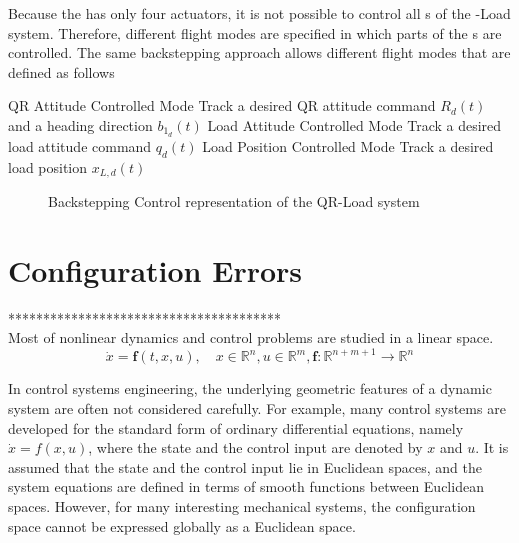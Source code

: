 Because the  has only four actuators, it is not possible to control all s of the -Load system. Therefore, different flight modes are specified in which parts of the s are controlled. The same backstepping approach allows different flight modes that are defined as follows
\begin{outline}
\1 QR Attitude Controlled Mode 
\2 Track a desired QR attitude command $ R_d(t) $ and a heading direction $ b_{1_d}(t) $
\1 Load Attitude Controlled Mode 
\2 Track a desired load attitude command $ q_d(t) $
\1 Load Position Controlled Mode
\2 Track a desired load position $ x_{L,d}(t) $
\end{outline}

\begin{figure}[h!]
	\centering
	\caption{Backstepping Control representation of the QR-Load system\label{fig:con.backstepQRL}}
\end{figure}		

\section{Configuration Errors}

***************************************\\
Most of nonlinear dynamics and control problems are studied in a linear space.\\
\begin{equation}\label{key}
\dot{x}=\textbf{f}(t,x,u), \quad x\in\mathbb{R}^n, u\in\mathbb{R}^m, \textbf{f}:\mathbb{R}^{n+m+1}\rightarrow\mathbb{R}^n
\end{equation}

In control systems engineering, the underlying geometric features of a dynamic system are often not considered carefully. For example, many control systems are developed for the standard form of ordinary differential equations, namely $ \dot{x}=f(x,u) $, where the state and the control input are denoted by $ x $ and $ u $. It is assumed that the state and the control input lie in Euclidean spaces, and the system equations are defined in terms of smooth functions between Euclidean spaces. However, for many interesting mechanical systems, the configuration space cannot be expressed globally as a Euclidean space.

